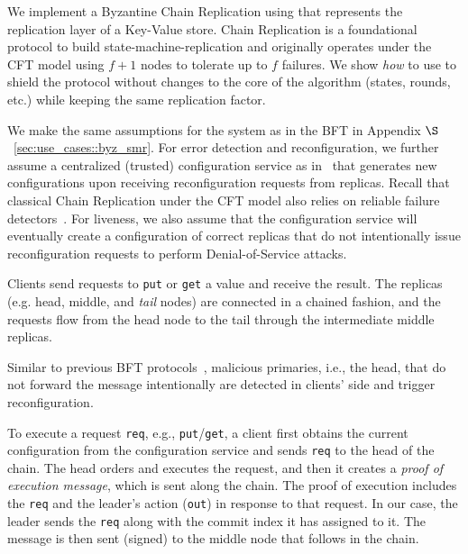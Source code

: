 


We implement a Byzantine Chain Replication using \projecttitle{} that represents the replication layer of a Key-Value store. Chain Replication is a foundational protocol to build state-machine-replication and originally operates under the CFT model using $f+1$ nodes to tolerate up to $f$ failures. We show {\em how} to use \projecttitle{} to shield the protocol without changes to the core of the algorithm (states, rounds, etc.) while keeping the same replication factor.




 We make the same assumptions for the system as in the BFT in Appendix $\S$~\ref{sec:use_cases::byz_smr}. For error detection and reconfiguration, we further assume a centralized (trusted) configuration service as in~\cite{10.1007/978-3-642-35476-2_24} that generates new configurations upon receiving reconfiguration requests from replicas. Recall that classical Chain Replication under the CFT model also relies on reliable failure detectors~\cite{chain-replication}. For liveness, we also assume that the configuration service will eventually create a configuration of correct replicas that do not intentionally issue reconfiguration requests to perform Denial-of-Service attacks. 

Clients send requests to {\tt put} or {\tt get} a value and receive the result. The replicas (e.g. head, middle, and {\em tail} nodes) are connected in a chained fashion, and the requests flow from the head node to the tail through the intermediate middle replicas. 

Similar to previous BFT protocols~\cite{Castro:2002, minBFT}, malicious primaries, i.e., the head, that do not forward the message intentionally are detected in clients' side and trigger reconfiguration.


 To execute a request \texttt{req}, e.g., {\tt put}/{\tt get}, a client first obtains the current configuration from the configuration service and sends {\tt req} to the head of the chain. The head orders and executes the request, and then it creates a {\em proof of execution message}, which is sent along the chain. The proof of execution includes the {\tt req} and the leader's action ({\tt out}) in response to that request. In our case, the leader sends the {\tt req} along with the commit index it has assigned to it. The message is then sent (signed) to the middle node that follows in the chain.

